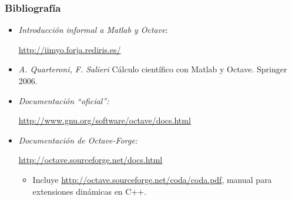 
\begin{frame}\frametitle{Bibliografía}
\begin{itemize}
\item {}
\textit{Introducción informal a Matlab y Octave}:\par
\href{http://iimyo.forja.rediris.es/}{http://iimyo.forja.rediris.es/}

\item {}
\emph{A. Quarteroni, F. Salieri} Cálculo científico con Matlab y
Octave. Springer 2006.

\item {}
\textit{Documentación ``oficial'':}\par
\href{http://www.gnu.org/software/octave/docs.html}{http://www.gnu.org/software/octave/docs.html}

\item {} 
\textit{Documentación de Octave-Forge:}\par
\href{http://octave.sourceforge.net/docs.html}{http://octave.sourceforge.net/docs.html}
\begin{itemize}
\item {} 
Incluye
\href{http://octave.sourceforge.net/coda/coda.pdf}{http://octave.sourceforge.net/coda/coda.pdf},
manual para extensiones dinámicas en C++.

\end{itemize}

\end{itemize}
\end{frame}

